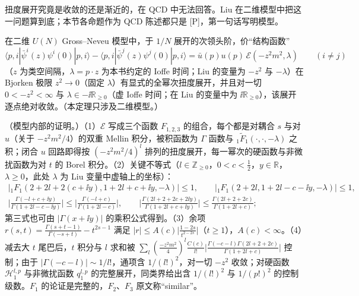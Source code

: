扭度展开究竟是收敛的还是渐近的，在 QCD 中无法回答。Liu 在二维模型中把这一问题算到底；本节各命题作为 QCD 陈述都只是 [P]，第一句话写明模型。

\begin{theorem}\label{thm:yzliu-gn-convergence}
在二维 $U(N)$ Gross--Neveu 模型中，于 $1/N$ 展开的次领头阶，价“结构函数” %
\begin{equation}\label{eq:yzliu-gn-sf}
\langle p,i|\bar\psi^i(z)\psi^i(0)|p,i\rangle-\langle p,i|\bar\psi^j(z)\psi^j(0)|p,i\rangle=\bar u(p)u(p)\,\mathcal E(-z^2m^2,\lambda)\qquad(i\ne j)
\end{equation}
（$z$ 为类空间隔，$\lambda=p\cdot z$ 为本书约定的 Ioffe 时间；Liu 的变量为 $-z^2$ 与 $-\lambda$）在 Bjorken 极限 $z^2\to0$（固定 $\lambda$）有显式的全幂次扭度展开，并且对一切 $0<-z^2<\infty$ 与 $\lambda\in-\ii\mathbb R_{\ge0}$（虚 Ioffe 时间；在 Liu 的变量中为 $\ii\mathbb R_{\ge0}$），该展开逐点绝对收敛。（本定理只涉及二维模型。）
\end{theorem}

\begin{proofsketch}
（模型内部的证明\cite[第~2、4~节]{Liu:2024omb}。）（1）$\mathcal E$ 写成三个函数 $F_{1,2,3}$ 的组合，每个都是对耦合 $s$ 与对 $u$（关于 $-z^2m^2/4$）的双重 Mellin 积分，被积函数为 $\Gamma$ 函数与 $_1\tilde F_1(\cdot,\cdot,-\lambda)$ 之积；闭合 $u$ 回路即得按 $(-z^2m^2/4)^l$ 排列的扭度展开，每一幂次的硬函数与非微扰函数为对 $t$ 的 Borel 积分\cite[式~(2.4)、(2.6)--(2.15)]{Liu:2024omb}。（2）关键不等式（$l\in\mathbb Z_{\ge0}$，$0<c<\frac12$，$y\in\mathbb R$，$\lambda\ge0$，此处 $\lambda$ 为 Liu 变量中虚轴上的坐标）\cite[式~(4.2)--(4.5)]{Liu:2024omb}：
\begin{gather*}
\big|{}_1F_1(2+2l+2(c+\ii y),1+2l+c+\ii y,-\lambda)\big|\le1,\qquad\big|{}_1F_1(2+2l,1+2l-c-\ii y,-\lambda)\big|\le1,\\
\Big|\frac{\Gamma(-l+c+\ii y)}{\Gamma(1+2l-c-\ii y)}\Big|\le\Big|\frac{\Gamma(-l+c)}{\Gamma(1+2l-c)}\Big|,\qquad\Big|\frac{\Gamma(2l+2+2c+2\ii y)}{\Gamma(1+2l+c+\ii y)}\Big|\le\frac{\Gamma(2l+2+2c)}{\Gamma(1+2l+c)} ;
\end{gather*}
第三式也可由 $|\Gamma(x+\ii y)|$ 的乘积公式得到。（3）余项 $r(s,t)=\frac{\Gamma(s+t-1)}{\Gamma(-s+t)}-t^{2s-1}$ 满足 $|r|\le A(c)\big|\frac{1-2s}{t^{2-2s}}\big|$（$t\ge1$），$A(c)<\infty$\cite[式~(4.7)]{Liu:2024omb}。（4）减去大 $t$ 尾巴后，$t$ 积分与 $l$ 求和被 $\sum_l(\frac{-z^2m^2}{4})^l\frac{C(c)}{l!}\big|\frac{\Gamma(-c-l)\Gamma(2l+2+2c)}{\Gamma(1+2l+c)}\big|$ 控制；由于 $|\Gamma(-c-l)|\sim1/l!$，通项含 $1/(l!)^2$，对一切 $-z^2$ 收敛；对硬函数 $\mathcal H^{l,p}_1$ 与非微扰函数 $q^{l,p}_1$ 的完整展开，同类界给出含 $1/(l!)^2$ 与 $1/(p!)^2$ 的控制级数\cite[式~(4.11)、(4.13)]{Liu:2024omb}。$F_1$ 的论证是完整的，$F_2$、$F_3$ 原文称“similar”。
\end{proofsketch}

